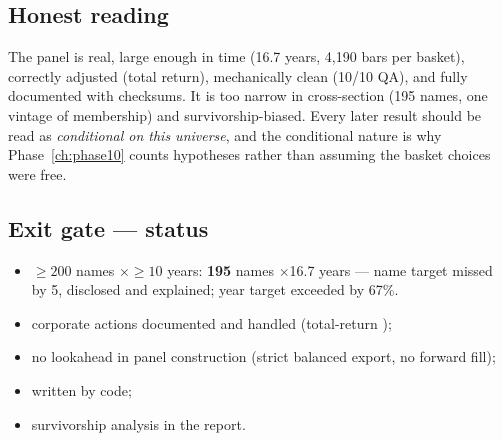 \subsection{Honest reading}

The panel is real, large enough in time (16.7 years, 4{,}190 bars per basket), correctly
adjusted (total return), mechanically clean (10/10 QA), and fully documented with
checksums. It is too narrow in cross-section (195 names, one vintage of membership) and
survivorship-biased. Every later result should be read as \emph{conditional on this
universe}, and the conditional nature is why Phase~\ref{ch:phase10} counts hypotheses
rather than assuming the basket choices were free.

\subsection{Exit gate --- status}

\begin{itemize}
  \item[\checkmark] $\ge200$ names $\times\ge10$ years: \textbf{195} names
    $\times$16.7 years --- name target missed by 5, disclosed and explained;
    year target exceeded by 67\%.
  \item[\checkmark] corporate actions documented and handled (total-return
    );
  \item[\checkmark] no lookahead in panel construction (strict balanced export, no
    forward fill);
  \item[\checkmark]  written by code;
  \item[\checkmark] survivorship analysis in the report.
\end{itemize}
